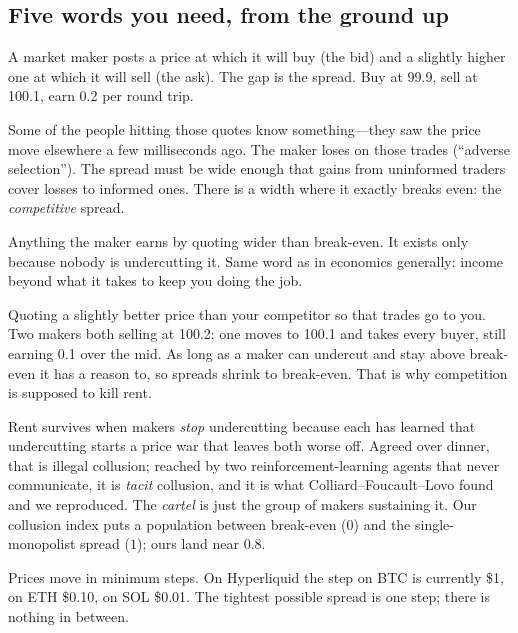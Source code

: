 \documentclass[11pt]{article}
\begin{document}
\subsection{Five words you need, from the ground up}
\begin{description}[style=sameline,leftmargin=0pt,itemsep=2pt]
\item[Spread] A market maker posts a price at which it will buy (the bid) and a slightly higher one at
which it will sell (the ask). The gap is the spread. Buy at 99.9, sell at 100.1, earn 0.2 per round trip.
\item[Why the spread cannot be zero] Some of the people hitting those quotes know something---they saw
the price move elsewhere a few milliseconds ago. The maker loses on those trades (``adverse
selection''). The spread must be wide enough that gains from uninformed traders cover losses to informed
ones. There is a width where it exactly breaks even: the \emph{competitive} spread.
\item[Rent] Anything the maker earns by quoting wider than break-even. It exists only because nobody is
undercutting it. Same word as in economics generally: income beyond what it takes to keep you doing the job.
\item[Undercutting] Quoting a slightly better price than your competitor so that trades go to you. Two
makers both selling at 100.2; one moves to 100.1 and takes every buyer, still earning 0.1 over the mid. As
long as a maker can undercut and stay above break-even it has a reason to, so spreads shrink to
break-even. That is why competition is supposed to kill rent.
\item[Collusion, cartel] Rent survives when makers \emph{stop} undercutting because each has learned that
undercutting starts a price war that leaves both worse off. Agreed over dinner, that is illegal
collusion; reached by two reinforcement-learning agents that never communicate, it is \emph{tacit}
collusion, and it is what Colliard--Foucault--Lovo found and we reproduced. The \emph{cartel} is just the
group of makers sustaining it. Our collusion index puts a population between break-even ($0$) and the
single-monopolist spread ($1$); ours land near $0.8$.
\item[Tick] Prices move in minimum steps. On Hyperliquid the step on BTC is currently \$1, on ETH \$0.10,
on SOL \$0.01. The tightest possible spread is one step; there is nothing in between.
\end{description}
\end{document}
